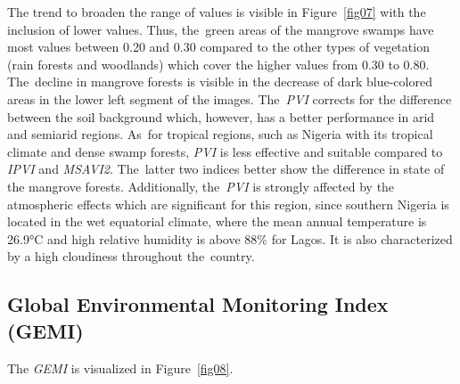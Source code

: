 \documentclass[jmse,article,accept,pdftex,moreauthors]{Definitions/mdpi}
\begin{document}
The trend to broaden the range of values is visible in Figure~\ref{fig07} with the inclusion of lower values. Thus, the~green areas of the mangrove swamps have most values between 0.20 and 0.30 compared to the other types of vegetation (rain forests and woodlands) which cover the higher values from 0.30 to 0.80. The~decline in mangrove forests is visible in the decrease of dark blue-colored areas in the lower left segment of the images. The~\emph{PVI} corrects for the difference between the soil background which, however, has a better performance in arid and semiarid regions. As~for tropical regions, such as Nigeria with its tropical climate and dense swamp forests, \emph{PVI} is less effective and suitable compared to \emph{IPVI} and \emph{MSAVI2}. The~latter two indices better show the difference in state of the mangrove forests. Additionally, the~\emph{PVI} is strongly affected by the atmospheric effects which are significant for this region, since southern Nigeria is located in the wet equatorial climate, where the mean annual temperature is 26.9°C and high relative humidity is above 88\% for Lagos. It is also characterized by a high cloudiness throughout the~country. 

\subsection{Global Environmental Monitoring Index (GEMI)}

The \emph{GEMI} is visualized in Figure~\ref{fig08}.
\end{document}

